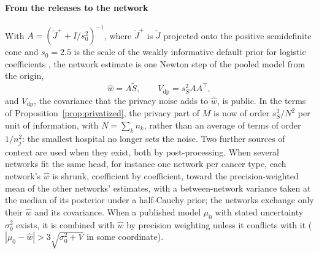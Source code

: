 \documentclass[acmsmall,screen,review]{acmart}
\theoremstyle{acmdefinition}
\begin{document}
\paragraph{From the releases to the network} With $A=(\tilde{J}^{+}+I/s_0^2)^{-1}$, where $\tilde{J}^{+}$ is $\tilde{J}$ projected onto the positive semidefinite cone and $s_0=2.5$ is the scale of the weakly informative default prior for logistic coefficients \cite{gelman2008weakly}, the network estimate is one Newton step of the pooled model from the origin,
\[
\hat{w}=A\tilde{S},\qquad V_{\mathrm{dp}}=s_S^2AA^{\top},
\]
and $V_{\mathrm{dp}}$, the covariance that the privacy noise adds to $\hat{w}$, is public. In the terms of Proposition~\ref{prop:privatized}, the privacy part of $M$ is now of order $s_S^2/N^2$ per unit of information, with $N=\sum_k n_k$, rather than an average of terms of order $1/n_j^2$: the smallest hospital no longer sets the noise. Two further sources of context are used when they exist, both by post-processing. When several networks fit the same head, for instance one network per cancer type, each network's $\hat{w}$ is shrunk, coefficient by coefficient, toward the precision-weighted mean of the other networks' estimates, with a between-network variance taken at the median of its posterior under a half-Cauchy prior; the networks exchange only their $\hat{w}$ and its covariance. When a published model $\mu_0$ with stated uncertainty $\sigma_0^2$ exists, it is combined with $\hat{w}$ by precision weighting unless it conflicts with it ($|\mu_0-\hat{w}|>3\sqrt{\sigma_0^2+V}$ in some coordinate).
\end{document}
